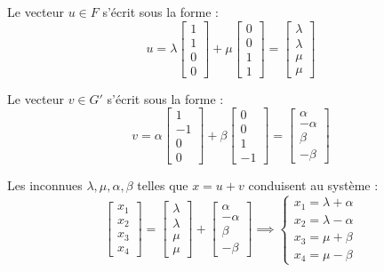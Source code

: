 \documentclass[10pt,a4paper]{article}
\begin{document}
Le vecteur \( u \in F \) s'écrit sous la forme :
\[
u = \lambda \begin{bmatrix} 1 \\ 1 \\ 0 \\ 0 \end{bmatrix} + \mu \begin{bmatrix} 0 \\ 0 \\ 1 \\ 1 \end{bmatrix}
= \begin{bmatrix} \lambda \\ \lambda \\ \mu \\ \mu \end{bmatrix}
\]

Le vecteur \( v \in G' \) s'écrit sous la forme :
\[
v = \alpha \begin{bmatrix} 1 \\ -1 \\ 0 \\ 0 \end{bmatrix} + \beta \begin{bmatrix} 0 \\ 0 \\ 1 \\ -1 \end{bmatrix}
= \begin{bmatrix} \alpha \\ -\alpha \\ \beta \\ -\beta \end{bmatrix}
\]

Les inconnues \( \lambda, \mu, \alpha, \beta \) telles que \( x = u + v \) conduisent au système :
\[
\begin{bmatrix} x_1 \\ x_2 \\ x_3 \\ x_4 \end{bmatrix}
=
\begin{bmatrix} \lambda \\ \lambda \\ \mu \\ \mu \end{bmatrix}
+
\begin{bmatrix} \alpha \\ -\alpha \\ \beta \\ -\beta \end{bmatrix}
\implies
\begin{cases}
x_1 = \lambda + \alpha \\
x_2 = \lambda - \alpha \\
x_3 = \mu + \beta \\
x_4 = \mu - \beta
\end{cases}
\]
\end{document}
